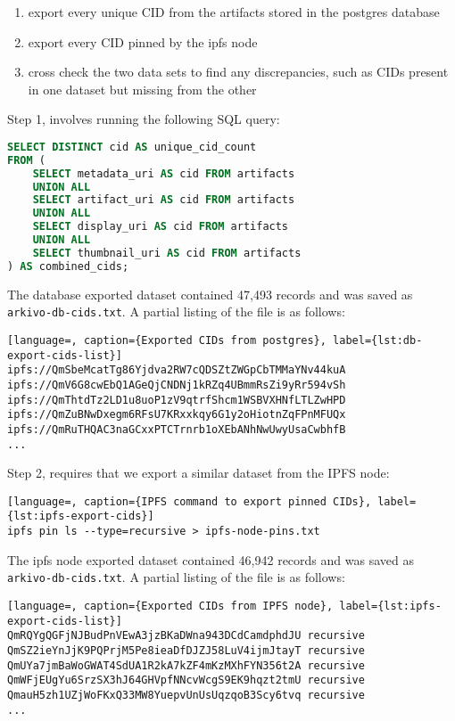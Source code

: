 \begin{enumerate}
    \item export every unique CID from the artifacts stored in the postgres database
    \item export every CID pinned by the ipfs node
    \item cross check the two data sets to find any discrepancies, such as CIDs present in one dataset but missing from the other
\end{enumerate}

Step 1, involves running the following SQL query:

\begin{lstlisting}[language=SQL, caption={SQL to export all IPFS CIDs store in DB}, label={lst:db-export-cids}] 
SELECT DISTINCT cid AS unique_cid_count
FROM (
    SELECT metadata_uri AS cid FROM artifacts
    UNION ALL
    SELECT artifact_uri AS cid FROM artifacts
    UNION ALL
    SELECT display_uri AS cid FROM artifacts
    UNION ALL
    SELECT thumbnail_uri AS cid FROM artifacts
) AS combined_cids;
\end{lstlisting}

The database exported dataset contained 47,493 records and was saved as \texttt{arkivo-db-cids.txt}. A partial listing of the file is as follows:

\begin{lstlisting}[language=, caption={Exported CIDs from postgres}, label={lst:db-export-cids-list}] 
ipfs://QmSbeMcatTg86Yjdva2RW7cQDSZtZWGpCbTMMaYNv44kuA
ipfs://QmV6G8cwEbQ1AGeQjCNDNj1kRZq4UBmmRsZi9yRr594vSh
ipfs://QmThtdTz2LD1u8uoP1zV9qtrfShcm1WSBVXHNfLTLZwHPD
ipfs://QmZuBNwDxegm6RFsU7KRxxkqy6G1y2oHiotnZqFPnMFUQx
ipfs://QmRuTHQAC3naGCxxPTCTrnrb1oXEbANhNwUwyUsaCwbhfB
...
\end{lstlisting}

Step 2, requires that we export a similar dataset from the IPFS node:

\begin{lstlisting}[language=, caption={IPFS command to export pinned CIDs}, label={lst:ipfs-export-cids}] 
ipfs pin ls --type=recursive > ipfs-node-pins.txt
\end{lstlisting}

The ipfs node exported dataset contained 46,942 records and was saved as \texttt{arkivo-db-cids.txt}. A partial listing of the file is as follows:

\begin{lstlisting}[language=, caption={Exported CIDs from IPFS node}, label={lst:ipfs-export-cids-list}] 
QmRQYgQGFjNJBudPnVEwA3jzBKaDWna943DCdCamdphdJU recursive
QmSZ2ieYnJjK9PQPrjM5Pe8ieaDfDJZJ58LuV4ijmJtayT recursive
QmUYa7jmBaWoGWAT4SdUA1R2kA7kZF4mKzMXhFYN356t2A recursive
QmWFjEUgYu6SrzSX3hJ64GHVpfNNcvWcgS9EK9hqzt2tmU recursive
QmauH5zh1UZjWoFKxQ33MW8YuepvUnUsUqzqoB3Scy6tvq recursive
...
\end{lstlisting}

